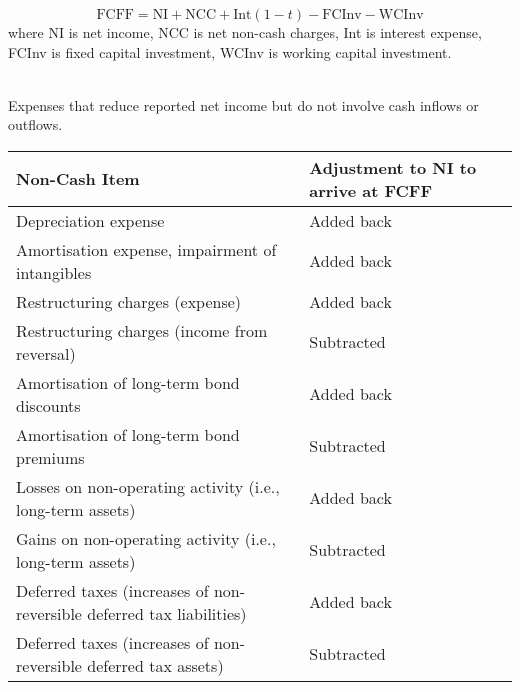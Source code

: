 \begin{method} 
\begin{equation}
\text{FCFF} = \text{NI} + \text{NCC} + \text{Int}(1-t) - \text{FCInv} - \text{WCInv} \nonumber
\end{equation}
where NI is net income, NCC is net non-cash charges, Int is interest expense, FCInv is fixed capital investment, WCInv is working capital investment.\\
\end{method}

\begin{remark} \\
Expenses that reduce reported net income but do not involve cash inflows or outflows.
\begin{flushleft}
\begin{tabularx}{\textwidth}{p{28em}|X}
\hline
\rowcolor{gray!30}
Non-Cash Item & Adjustment to NI to arrive at FCFF\\
\hline
Depreciation expense & Added back \\
\hline
Amortisation expense, impairment of intangibles & Added back \\
\hline
Restructuring charges (expense) & Added back \\
\hline
Restructuring charges (income from reversal) & Subtracted \\
\hline
Amortisation of long-term bond discounts & Added back \\
\hline
Amortisation of long-term bond premiums & Subtracted \\
\hline
Losses on non-operating activity (i.e., long-term assets) & Added back \\
\hline
Gains on non-operating activity (i.e., long-term assets) & Subtracted \\
\hline
Deferred taxes (increases of non-reversible deferred tax liabilities) & Added back \\
\hline
Deferred taxes (increases of non-reversible deferred tax assets) & Subtracted \\
\hline
\end{tabularx}
\end{flushleft}
\end{remark}

